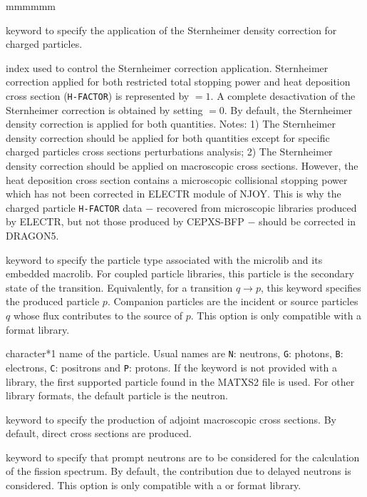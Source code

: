 \begin{ListeDeDescription}{mmmmmm}
\item[\moc{STERN}] keyword to specify the application of the Sternheimer density correction for charged particles.

\item[\dusa{nstern}] index used to control the Sternheimer correction application. Sternheimer correction applied for both restricted total stopping power
and heat deposition cross section ({\tt H-FACTOR}) is represented by  $=1$. A complete desactivation of the Sternheimer correction is obtained
by setting  $=0$. By default, the Sternheimer density correction is applied for both quantities. Notes: 1) The Sternheimer density correction should be
applied for both quantities except for specific charged particles cross sections perturbations analysis; 2) The Sternheimer density correction should be
applied on macroscopic cross sections. However, the heat deposition cross section contains a microscopic collisional stopping power which has not been
corrected in ELECTR module of NJOY. This is why the charged particle {\tt H-FACTOR} data $-$ recovered from microscopic libraries produced by ELECTR, but not
those produced by CEPXS-BFP $-$ should be corrected in DRAGON5.

\item[\moc{PARTICLE}] keyword to specify the particle type associated with the
{\sc microlib} and its embedded {\sc macrolib}. For coupled particle
 libraries, this particle is the secondary state of the transition.
Equivalently, for a transition $q \rightarrow p$, this keyword specifies the
produced particle $p$. Companion particles are the incident or source particles
$q$ whose flux contributes to the source of $p$. This option is only compatible
with a  format library.

\item[\dusa{htype}] character*1 name of the particle. Usual names are {\tt N}:
neutrons, {\tt G}: photons, {\tt B}: electrons, {\tt C}: positrons and
{\tt P}: protons. If the  keyword is not provided with a
 library, the first supported particle found in the MATXS2 file is
used. For other library formats, the default particle is the neutron.

\item[\moc{ADJ}] keyword to specify the production of adjoint macroscopic
cross sections. By default, direct cross sections are produced.

\item[\moc{PROM}] keyword to specify that prompt neutrons are to be considered
for the calculation of the fission spectrum. By default, the contribution due to
delayed neutrons is considered. This option is only compatible with a
 or  format library.


\end{ListeDeDescription}
